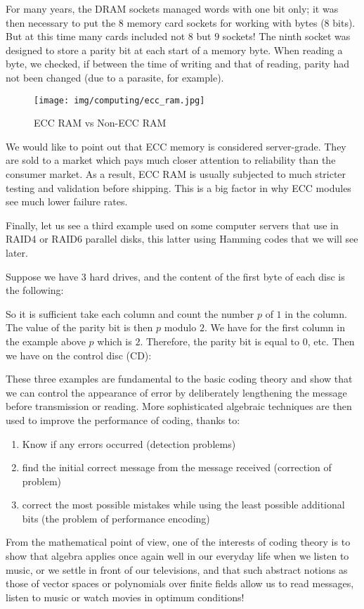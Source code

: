 	For many years, the DRAM sockets managed words with one bit only; it was then necessary to put the $8$ memory card sockets for working with bytes ($8$ bits). But at this time many cards included not $8$ but $9$ sockets! The ninth socket was designed to store a parity bit at each start of a memory byte. When reading a byte, we checked, if between the time of writing and that of reading, parity had not been changed (due to a parasite, for example).
	\begin{figure}[H]
		\centering
		\texttt{[image: img/computing/ecc\_ram.jpg]}
		\caption{ECC RAM vs Non-ECC RAM}
	\end{figure}
	\begin{tcolorbox}[title=Remark,colframe=black,arc=10pt]
	We would like to point out that ECC memory is considered server-grade. They are sold to a market which pays much closer attention to reliability than the consumer market. As a result, ECC RAM is usually subjected to much stricter testing and validation before shipping. This is a big factor in why ECC modules see much lower failure rates.
	\end{tcolorbox}
	Finally, let us see a third example used on some computer servers that use  in RAID4 or RAID6 parallel disks, this latter using Hamming codes that we will see later.
	
	Suppose we have $3$ hard drives, and the content of the first byte of each disc is the following:
	
	So it is sufficient take each column and count the number $p$ of $1$ in the column. The value of the parity bit is then $p$ modulo $2$. We have for the first column in the example above $p$ which is $2$. Therefore, the parity bit is equal to $0$, etc. Then we have on the control disc (CD):
	
	These three examples are fundamental to the basic coding theory and show that we can control the appearance of error by deliberately lengthening the message before transmission or reading. More sophisticated algebraic techniques are then used to improve the performance of coding, thanks to:
	
	\begin{enumerate}
		\item Know if any errors occurred (detection problems)
		
		\item find the initial correct message from the message received (correction of problem)
		
		\item correct the most  possible mistakes while using the least possible additional bits (the problem of performance encoding)
	\end{enumerate}
	From the mathematical point of view, one of the interests of coding theory is to show that algebra applies once again well in our everyday life when we listen to music, or we settle in front of our televisions, and that such abstract notions as those of vector spaces or polynomials over finite fields allow us to read messages, listen to music or watch movies in optimum conditions!
	
